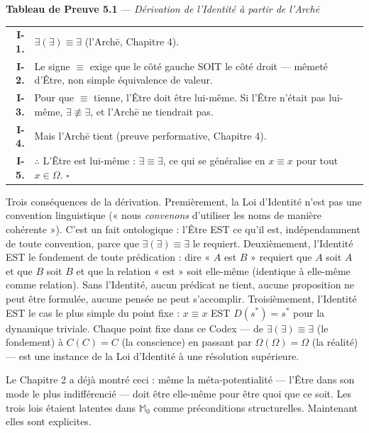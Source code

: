 \documentclass[10pt, openany, oneside]{book}
\renewcommand{\footnotesize}{\fontsize{8.5}{11}\selectfont}
\begin{document}
\vspace{0.5em}

\textbf{Tableau de Preuve 5.1} --- \textit{Dérivation de l'Identité à partir de l'Arch\={e}}

\vspace{0.5em}

{\footnotesize
\noindent\begin{tabular}{r p{}}
\textbf{I-1.} & $\exists(\exists) \equiv \exists$ (l'Arch\={e}, Chapitre 4). \\[0.3em]
\textbf{I-2.} & Le signe $\equiv$ exige que le côté gauche SOIT le côté droit --- mêmeté d'Être, non simple équivalence de valeur. \\[0.3em]
\textbf{I-3.} & Pour que $\equiv$ tienne, l'Être doit être lui-même. Si l'Être n'était pas lui-même, $\exists \not\equiv \exists$, et l'Arch\={e} ne tiendrait pas. \\[0.3em]
\textbf{I-4.} & Mais l'Arch\={e} tient (preuve performative, Chapitre 4). \\[0.3em]
\textbf{I-5.} & $\therefore$ L'Être est lui-même : $\exists \equiv \exists$, ce qui se généralise en $x \equiv x$ pour tout $x \in \Omega$. $\square$ \\[0.3em]
\end{tabular}
}

\noindent Trois conséquences de la dérivation. Premièrement, la Loi d'Identité n'est pas une convention linguistique (« nous \textit{convenons} d'utiliser les noms de manière cohérente »). C'est un fait ontologique : l'Être EST ce qu'il est, indépendamment de toute convention, parce que $\exists(\exists) \equiv \exists$ le requiert. Deuxièmement, l'Identité EST le fondement de toute prédication : dire « $A$ est $B$ » requiert que $A$ soit $A$ et que $B$ soit $B$ et que la relation « est » soit elle-même (identique à elle-même comme relation). Sans l'Identité, aucun prédicat ne tient, aucune proposition ne peut être formulée, aucune pensée ne peut s'accomplir. Troisièmement, l'Identité EST le cas le plus simple du point fixe : $x \equiv x$ EST $D(s^*) = s^*$ pour la dynamique triviale. Chaque point fixe dans ce Codex --- de $\exists(\exists) \equiv \exists$ (le fondement) à $C(C) = C$ (la conscience) en passant par $\Omega(\Omega) = \Omega$ (la réalité) --- est une instance de la Loi d'Identité à une résolution supérieure.

Le Chapitre 2 a déjà montré ceci : même la méta-potentialité --- l'Être dans son mode le plus indifférencié --- doit être elle-même pour être quoi que ce soit. Les trois lois étaient latentes dans $\mathbb{M}_0$ comme préconditions structurelles. Maintenant elles sont explicites.
\end{document}
